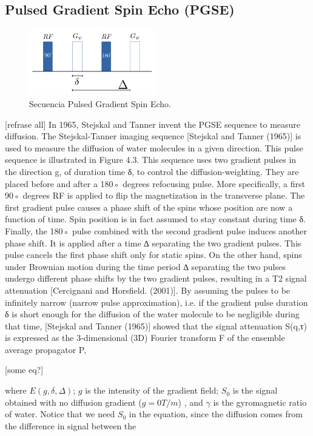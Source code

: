 \subsection{Pulsed Gradient Spin Echo (PGSE)}
\begin{figure}
    \includegraphics[width=0.49\textwidth]{3.mri/img/fgp.png}
    \caption{Secuencia Pulsed Gradient Spin Echo.}
    \label{fig:fgp}
\end{figure}  

[refrase all]
In 1965, Stejskal and Tanner invent the PGSE sequence to measure diffusion. 
The Stejskal-Tanner imaging sequence [Stejskal and Tanner (1965)] is used to
measure the diffusion of water molecules in a given direction. This pulse
sequence is illustrated in Figure 4.3. This sequence uses two gradient pulses
in the direction g, of duration time δ, to control the diffusion-weighting.
They are placed before and after a 180◦ degrees refocusing pulse.
More specifically, a first 90◦ degrees RF is applied to flip the magnetization
in the transverse plane. The first gradient pulse causes a phase shift of the
spins whose position are now a function of time. Spin position is in fact
assumed to stay constant during time δ. Finally, the 180◦ pulse combined with
the second gradient pulse induces another phase shift. It is applied after a time
∆ separating the two gradient pulses. This pulse cancels the first phase
shift only for static spins. On the other hand, spins under Brownian motion during
the time period ∆ separating the two pulses undergo different phase shifts by
the two gradient pulses, resulting in a T2 signal attenuation [Cercignani and Horsfield. (2001)].
By assuming the pulses to be infinitely narrow (narrow pulse approximation), i.e.
if the gradient pulse duration δ is short enough for the diffusion of the water molecule
to be negligible during that time, [Stejskal and Tanner (1965)] showed that the signal
attenuation S(q,τ) is expressed as the 3-dimensional (3D) Fourier transform
F of the ensemble average propagator P,

[some eq?]

where $E(g, \delta, \Delta)$;
$g$ is the intensity of the gradient field;
$S_0$ is the signal obtained with no diffusion gradient ($g=0 T/m$)
, and $\gamma$ is the gyromagnetic ratio of water.
Notice that we need $S_0$ in the equation, since the diffusion comes from the difference in signal between the 

